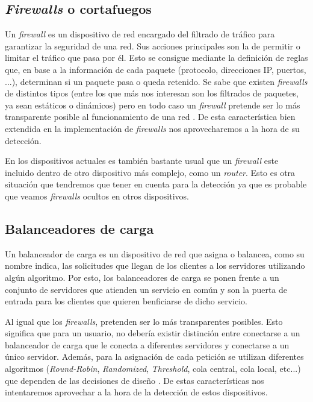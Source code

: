 \documentclass[twoside, 12pt]{epstfg}
\begin{document}
\subsection{\textit{Firewalls} o cortafuegos}
\label{subsec:Estado:Deteccion:Firewalls}
Un \textit{firewall} es un dispositivo de red encargado del filtrado de tráfico para garantizar la seguridad de una red. Sus acciones principales son la de permitir o limitar el tráfico que pasa por él. Esto se consigue mediante la definición de reglas que, en base a la información de cada paquete (protocolo, direcciones IP, puertos, ...), determinan si un paquete pasa o queda retenido. Se sabe que existen \textit{firewalls} de distintos tipos (entre los que más nos interesan son los filtrados de paquetes, ya sean estáticos o dinámicos) pero en todo caso un \textit{firewall} pretende ser lo más transparente posible al funcionamiento de una red \cite{Cheswick2003}. De esta característica bien extendida en la implementación de \textit{firewalls} nos aprovecharemos a la hora de su detección.

En los dispositivos actuales es también bastante usual que un \textit{firewall} este incluido dentro de otro dispositivo más complejo, como un \textit{router}. Esto es otra situación que tendremos que tener en cuenta para la detección ya que es probable que veamos \textit{firewalls} ocultos en otros dispositivos.

\subsection{Balanceadores de carga}
Un balanceador de carga es un dispositivo de red que asigna o balancea, como su nombre indica, las solicitudes que llegan de los clientes a los servidores utilizando algún algoritmo. Por esto, los balanceadores de carga se ponen frente a un conjunto de servidores que atienden un servicio en común y son la puerta de entrada para los clientes que quieren benficiarse de dicho servicio. 

Al igual que los \textit{firewalls}, pretenden ser lo más transparentes posibles. Esto significa que para un usuario, no debería existir distinción entre conectarse a un balanceador de carga que le conecta a diferentes servidores y conectarse a un único servidor. Además, para la asignación de cada petición se utilizan diferentes algoritmos (\textit{Round-Robin}, \textit{Randomized}, \textit{Threshold}, cola central, cola local, etc...) que dependen de las decisiones de diseño \cite{Wadhwa2014}. De estas características nos intentaremos aprovechar a la hora de la detección de estos dispositivos. 
\end{document}
